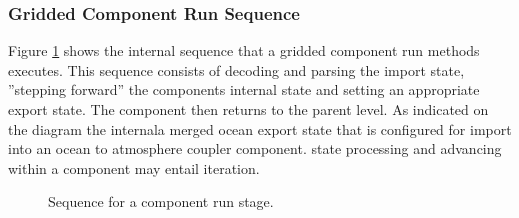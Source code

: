 \subsubsection{Gridded Component Run Sequence}
Figure \ref{fig:GriddedComponentsRunSequence} shows the internal sequence
that a gridded component run methods executes. This sequence consists
of decoding and parsing the import state, ''stepping forward'' the components
internal state and setting an appropriate export state. The component then
returns to the parent level. As indicated on the diagram the internala merged ocean export state that is
configured for import into an ocean to atmosphere coupler component.
state processing and advancing within a component may entail iteration.
\begin{figure}
\caption[{Sequence in a Component Run}]{Sequence for a component
run stage.\\}
\label{fig:GriddedComponentsRunSequence}
\end{figure}

